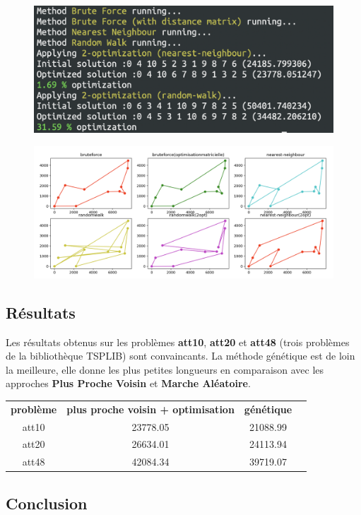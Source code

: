 \documentclass[11pt]{article}
\begin{document}
\begin{figure}[H]
	\centering
		\includegraphics[scale=0.5]{capture_2} \\
\end{figure}
\begin{figure}[H]
	\centering
		\includegraphics[scale=0.25]{capture_3} \\
\end{figure}


\subsection*{Résultats}

Les résultats obtenus sur les problèmes \textbf{att10}, \textbf{att20} et \textbf{att48} (trois problèmes de la bibliothèque TSPLIB) sont convaincants. La méthode génétique est de loin la meilleure, elle donne les plus petites longueurs en comparaison avec les approches \textbf{Plus Proche Voisin} et \textbf{Marche Aléatoire}.\\

\begin{tabular}{ | c | c | c | c | }
	\textbf{problème} & \textbf{plus proche voisin + optimisation} & \textbf{génétique} \\
	att10	& 23778.05 & 21088.99 \\
	att20	& 26634.01 & 24113.94 \\
	att48	& 42084.34 & 39719.07 \\
\end{tabular}

\subsection*{Conclusion}
\end{document}
